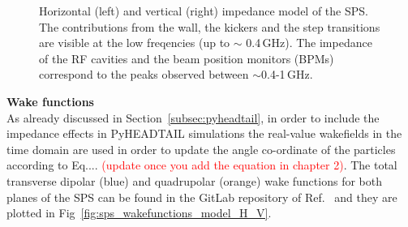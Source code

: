 \begin{figure}[!ht]
\begin{subfigure}[t]{0.45\textwidth}
    \end{subfigure}
    \hfill
     \caption{Horizontal (left) and vertical (right) impedance model of the SPS. The contributions from the wall, the kickers and the step transitions are visible at the low freqencies (up to $\sim$ 0.4\,GHz). The impedance of the RF cavities and the beam position monitors (BPMs) correspond to the peaks observed between $\sim$0.4-1\,GHz.}
     
     \label{fig:sps_impedance_model_H_V}
 \end{figure}



\normalsize{\textbf{Wake functions}}\\
As already discussed in Section~\ref{subsec:pyheadtail}, in order to include the impedance effects in PyHEADTAIL simulations the real-value wakefields in the time domain are used in order to update the angle co-ordinate of the particles according to Eq.... \textcolor{red}{(update once you add the equation in chapter 2)}. 
The total transverse dipolar (blue) and quadrupolar (orange) wake functions for both planes of the SPS can be found in the GitLab repository of Ref.~\cite{sps_impedance_model_git} and they are plotted in Fig~\ref{fig:sps_wakefunctions_model_H_V}.


